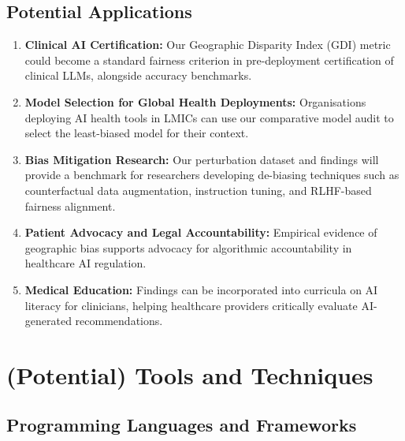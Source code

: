\documentclass[12pt, a4paper]{article}
\begin{document}
\subsection{Potential Applications}

\begin{enumerate}
  \item \textbf{Clinical AI Certification:} Our Geographic Disparity Index (GDI) metric could become a standard fairness criterion in pre-deployment certification of clinical LLMs, alongside accuracy benchmarks.
  \item \textbf{Model Selection for Global Health Deployments:} Organisations deploying AI health tools in LMICs can use our comparative model audit to select the least-biased model for their context.
  \item \textbf{Bias Mitigation Research:} Our perturbation dataset and findings will provide a benchmark for researchers developing de-biasing techniques such as counterfactual data augmentation, instruction tuning, and RLHF-based fairness alignment.
  \item \textbf{Patient Advocacy and Legal Accountability:} Empirical evidence of geographic bias supports advocacy for algorithmic accountability in healthcare AI regulation.
  \item \textbf{Medical Education:} Findings can be incorporated into curricula on AI literacy for clinicians, helping healthcare providers critically evaluate AI-generated recommendations.
\end{enumerate}

\section{(Potential) Tools and Techniques}

\subsection{Programming Languages and Frameworks}
\end{document}
